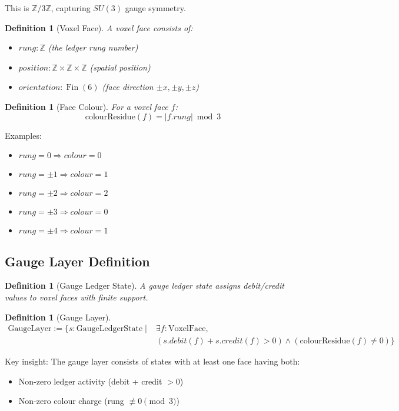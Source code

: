 \documentclass[11pt]{article}
\numberwithin{equation}{section}
\newtheorem{definition}[theorem]{Definition}
\theoremstyle{remark}
\newcommand{\Z}{\mathbb{Z}}
\DeclareMathOperator{\Fin}{Fin}
\begin{document}
This is $\Z/3\Z$, capturing $SU(3)$ gauge symmetry.

\begin{definition}[Voxel Face]
A voxel face consists of:
\begin{itemize}
\item $rung : \Z$ (the ledger rung number)
\item $position : \Z \times \Z \times \Z$ (spatial position)
\item $orientation : \Fin(6)$ (face direction $\pm x, \pm y, \pm z$)
\end{itemize}
\end{definition}

\begin{definition}[Face Colour]
For a voxel face $f$:
\[\text{colourResidue}(f) = |f.rung| \bmod 3\]
\end{definition}

Examples:
\begin{itemize}
\item $rung = 0 \Rightarrow colour = 0$
\item $rung = \pm 1 \Rightarrow colour = 1$
\item $rung = \pm 2 \Rightarrow colour = 2$
\item $rung = \pm 3 \Rightarrow colour = 0$
\item $rung = \pm 4 \Rightarrow colour = 1$
\end{itemize}

\subsection{Gauge Layer Definition}

\begin{definition}[Gauge Ledger State]
A gauge ledger state assigns debit/credit values to voxel faces with finite support.
\end{definition}

\begin{definition}[Gauge Layer]
\begin{align}
\text{GaugeLayer} := \{s : \text{GaugeLedgerState} \mid 
&\exists f : \text{VoxelFace},\\
&(s.debit(f) + s.credit(f) > 0) \wedge (\text{colourResidue}(f) \neq 0)\}
\end{align}
\end{definition}

Key insight: The gauge layer consists of states with at least one face having both:
\begin{itemize}
\item Non-zero ledger activity (debit + credit $> 0$)
\item Non-zero colour charge (rung $\not\equiv 0 \pmod{3}$)
\end{itemize}
\end{document}
